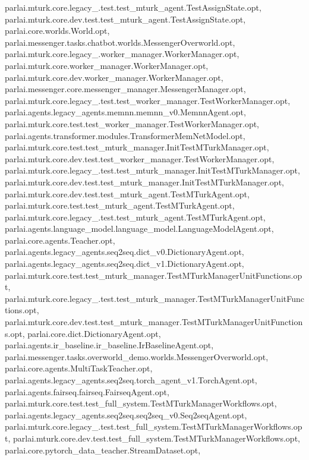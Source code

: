 parlai.\+mturk.\+core.\+legacy\+\_.\+test.\+test\+\_\+mturk\+\_\+agent.\+Test\+Assign\+State.\+opt, parlai.\+mturk.\+core.\+dev.\+test.\+test\+\_\+mturk\+\_\+agent.\+Test\+Assign\+State.\+opt, parlai.\+core.\+worlds.\+World.\+opt, parlai.\+messenger.\+tasks.\+chatbot.\+worlds.\+Messenger\+Overworld.\+opt, parlai.\+mturk.\+core.\+legacy\+\_.\+worker\+\_\+manager.\+Worker\+Manager.\+opt, parlai.\+mturk.\+core.\+worker\+\_\+manager.\+Worker\+Manager.\+opt, parlai.\+mturk.\+core.\+dev.\+worker\+\_\+manager.\+Worker\+Manager.\+opt, parlai.\+messenger.\+core.\+messenger\+\_\+manager.\+Messenger\+Manager.\+opt, parlai.\+mturk.\+core.\+legacy\+\_.\+test.\+test\+\_\+worker\+\_\+manager.\+Test\+Worker\+Manager.\+opt, parlai.\+agents.\+legacy\+\_\+agents.\+memnn.\+memnn\+\_\+v0.\+Memnn\+Agent.\+opt, parlai.\+mturk.\+core.\+test.\+test\+\_\+worker\+\_\+manager.\+Test\+Worker\+Manager.\+opt, parlai.\+agents.\+transformer.\+modules.\+Transformer\+Mem\+Net\+Model.\+opt, parlai.\+mturk.\+core.\+test.\+test\+\_\+mturk\+\_\+manager.\+Init\+Test\+M\+Turk\+Manager.\+opt, parlai.\+mturk.\+core.\+dev.\+test.\+test\+\_\+worker\+\_\+manager.\+Test\+Worker\+Manager.\+opt, parlai.\+mturk.\+core.\+legacy\+\_.\+test.\+test\+\_\+mturk\+\_\+manager.\+Init\+Test\+M\+Turk\+Manager.\+opt, parlai.\+mturk.\+core.\+dev.\+test.\+test\+\_\+mturk\+\_\+manager.\+Init\+Test\+M\+Turk\+Manager.\+opt, parlai.\+mturk.\+core.\+dev.\+test.\+test\+\_\+mturk\+\_\+agent.\+Test\+M\+Turk\+Agent.\+opt, parlai.\+mturk.\+core.\+test.\+test\+\_\+mturk\+\_\+agent.\+Test\+M\+Turk\+Agent.\+opt, parlai.\+mturk.\+core.\+legacy\+\_.\+test.\+test\+\_\+mturk\+\_\+agent.\+Test\+M\+Turk\+Agent.\+opt, parlai.\+agents.\+language\+\_\+model.\+language\+\_\+model.\+Language\+Model\+Agent.\+opt, parlai.\+core.\+agents.\+Teacher.\+opt, parlai.\+agents.\+legacy\+\_\+agents.\+seq2seq.\+dict\+\_\+v0.\+Dictionary\+Agent.\+opt, parlai.\+agents.\+legacy\+\_\+agents.\+seq2seq.\+dict\+\_\+v1.\+Dictionary\+Agent.\+opt, parlai.\+mturk.\+core.\+test.\+test\+\_\+mturk\+\_\+manager.\+Test\+M\+Turk\+Manager\+Unit\+Functions.\+opt, parlai.\+mturk.\+core.\+legacy\+\_.\+test.\+test\+\_\+mturk\+\_\+manager.\+Test\+M\+Turk\+Manager\+Unit\+Functions.\+opt, parlai.\+mturk.\+core.\+dev.\+test.\+test\+\_\+mturk\+\_\+manager.\+Test\+M\+Turk\+Manager\+Unit\+Functions.\+opt, parlai.\+core.\+dict.\+Dictionary\+Agent.\+opt, parlai.\+agents.\+ir\+\_\+baseline.\+ir\+\_\+baseline.\+Ir\+Baseline\+Agent.\+opt, parlai.\+messenger.\+tasks.\+overworld\+\_\+demo.\+worlds.\+Messenger\+Overworld.\+opt, parlai.\+core.\+agents.\+Multi\+Task\+Teacher.\+opt, parlai.\+agents.\+legacy\+\_\+agents.\+seq2seq.\+torch\+\_\+agent\+\_\+v1.\+Torch\+Agent.\+opt, parlai.\+agents.\+fairseq.\+fairseq.\+Fairseq\+Agent.\+opt, parlai.\+mturk.\+core.\+test.\+test\+\_\+full\+\_\+system.\+Test\+M\+Turk\+Manager\+Workflows.\+opt, parlai.\+agents.\+legacy\+\_\+agents.\+seq2seq.\+seq2seq\+\_\+v0.\+Seq2seq\+Agent.\+opt, parlai.\+mturk.\+core.\+legacy\+\_.\+test.\+test\+\_\+full\+\_\+system.\+Test\+M\+Turk\+Manager\+Workflows.\+opt, parlai.\+mturk.\+core.\+dev.\+test.\+test\+\_\+full\+\_\+system.\+Test\+M\+Turk\+Manager\+Workflows.\+opt, parlai.\+core.\+pytorch\+\_\+data\+\_\+teacher.\+Stream\+Dataset.\+opt, 